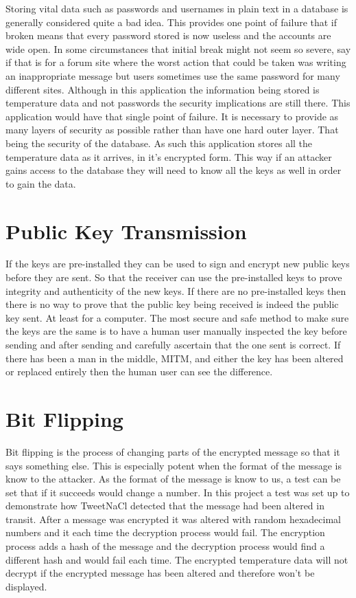 Storing vital data such as passwords and usernames in plain text in a database is generally considered quite a bad idea. This provides one point of failure that if broken means that every password stored is now useless and the accounts are wide open. In some circumstances that initial break might not seem so severe, say if that is for a forum site where the worst action that could be taken was writing an inappropriate message but users sometimes use the same password for many different sites. Although in this application the information being stored is temperature data and not passwords the security implications are still there. This application would have that single point of failure. It is necessary to provide as many layers of security as possible rather than have one hard outer layer. That being the security of the database. As such this application stores all the temperature data as it arrives, in it's encrypted form. This way if an attacker gains access to the database they will need to know all the keys as well in order to gain the data.

\section{Public Key Transmission}

If the keys are pre-installed they can be used to sign and encrypt new public keys before they are sent. So that the receiver can use the pre-installed keys to prove integrity and authenticity of the new keys. If there are no pre-installed keys then there is no way to prove that the public key being received is indeed the public key sent. At least for a computer. The most secure and safe method to make sure the keys are the same is to have a human user manually inspected the key before sending and after sending and carefully ascertain that the one sent is correct. If there has been a man in the middle, MITM, and either the key has been altered or replaced entirely then the human user can see the difference. 

\section{Bit Flipping}

Bit flipping is the process of changing parts of the encrypted message so that it says something else. This is especially potent when the format of the message is know to the attacker. As the format of the message is know to us, a test can be set that if it succeeds would change a number. In this project a test was set up to demonstrate how TweetNaCl detected that the message had been altered in transit. After a message was encrypted it was altered with random hexadecimal numbers and it each time the decryption process would fail. The encryption process adds a hash of the message and the decryption process would find a different hash and would fail each time. The encrypted temperature data will not decrypt if the encrypted message has been altered and therefore won't be displayed.

